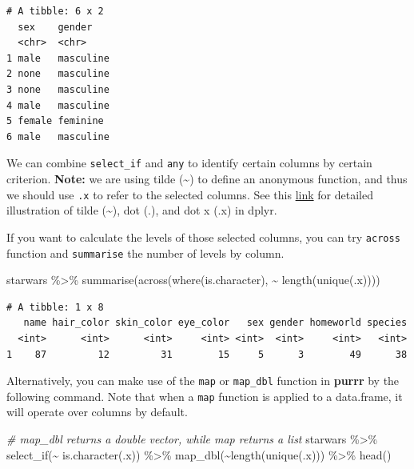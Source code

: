 \documentclass[
  letterpaper,
  DIV=11,
  numbers=noendperiod]{scrartcl}
\newenvironment{Shaded}{}{}
\newcommand{\CommentTok}[1]{\textcolor[rgb]{0.63,0.63,0.65}{\textit{#1}}}
\newcommand{\FunctionTok}[1]{\textcolor[rgb]{0.25,0.47,0.95}{#1}}
\newcommand{\NormalTok}[1]{\textcolor[rgb]{0.22,0.23,0.26}{#1}}
\newcommand{\SpecialCharTok}[1]{\textcolor[rgb]{0.00,0.52,0.74}{#1}}
\begin{document}
\begin{verbatim}
# A tibble: 6 x 2
  sex    gender   
  <chr>  <chr>    
1 male   masculine
2 none   masculine
3 none   masculine
4 male   masculine
5 female feminine 
6 male   masculine
\end{verbatim}

We can combine \texttt{select\_if} and \texttt{any} to identify certain
columns by certain criterion. \textbf{Note:} we are using tilde
(\textasciitilde) to define an anonymous function, and thus we should
use \texttt{.x} to refer to the selected columns. See this
\href{https://www.youtube.com/watch?v=ynaHKNdAAwk&t=364s}{link} for
detailed illustration of tilde (\textasciitilde), dot (.), and dot x
(.x) in dplyr.

If you want to calculate the levels of those selected columns, you can
try \texttt{across} function and \texttt{summarise} the number of levels
by column.

\begin{Shaded}
\begin{Highlighting}[]
\NormalTok{starwars }\SpecialCharTok{\%\textgreater{}\%}
  \FunctionTok{summarise}\NormalTok{(}\FunctionTok{across}\NormalTok{(}\FunctionTok{where}\NormalTok{(is.character), }\SpecialCharTok{\textasciitilde{}} \FunctionTok{length}\NormalTok{(}\FunctionTok{unique}\NormalTok{(.x))))}
\end{Highlighting}
\end{Shaded}

\begin{verbatim}
# A tibble: 1 x 8
   name hair_color skin_color eye_color   sex gender homeworld species
  <int>      <int>      <int>     <int> <int>  <int>     <int>   <int>
1    87         12         31        15     5      3        49      38
\end{verbatim}

Alternatively, you can make use of the \texttt{map} or \texttt{map\_dbl}
function in \textbf{purrr} by the following command. Note that when a
\texttt{map} function is applied to a data.frame, it will operate over
columns by default.

\begin{Shaded}
\begin{Highlighting}[]
\CommentTok{\# map\_dbl returns a double vector, while map returns a list}
\NormalTok{starwars }\SpecialCharTok{\%\textgreater{}\%}
  \FunctionTok{select\_if}\NormalTok{(}\SpecialCharTok{\textasciitilde{}} \FunctionTok{is.character}\NormalTok{(.x)) }\SpecialCharTok{\%\textgreater{}\%}
  \FunctionTok{map\_dbl}\NormalTok{(}\SpecialCharTok{\textasciitilde{}}\FunctionTok{length}\NormalTok{(}\FunctionTok{unique}\NormalTok{(.x))) }\SpecialCharTok{\%\textgreater{}\%}
  \FunctionTok{head}\NormalTok{()}
\end{Highlighting}
\end{Shaded}
\end{document}
